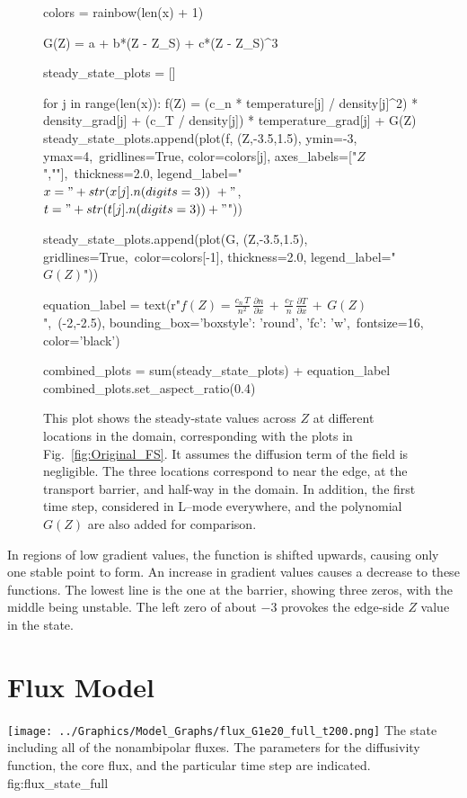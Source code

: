\begin{figure}[tb]
\begin{sagesilent}
		colors = rainbow(len(x) + 1)

		G(Z) = a + b*(Z - Z_S) + c*(Z - Z_S)^3

		steady_state_plots = []

		for j in range(len(x)):
		    f(Z) = (c_n * temperature[j] / density[j]^2) * density_grad[j] + (c_T / density[j]) * temperature_grad[j] + G(Z)
		    steady_state_plots.append(plot(f, (Z,-3.5,1.5), ymin=-3, ymax=4,\
		    		gridlines=True, color=colors[j], axes_labels=["$Z$",""],\
		    		thickness=2.0, legend_label="$x = " +str(x[j].n(digits=3))\
		    		+"$, $t = " +str(t[j].n(digits=3))+ "$"))

		steady_state_plots.append(plot(G, (Z,-3.5,1.5), gridlines=True,\
				color=colors[-1], thickness=2.0, legend_label="$G(Z)$"))

		equation_label = text(r"$f(Z) = \frac{c_n \, T}{n^2} \, \frac{\partial n}{\partial x} \,+\, \frac{c_T}{n} \, \frac{\partial T}{\partial x} \,+\, G(Z)$",\
				(-2,-2.5), bounding_box={'boxstyle': 'round', 'fc': 'w'},\
				fontsize=16, color='black')

		combined_plots = sum(steady_state_plots) + equation_label
		combined_plots.set_aspect_ratio(0.4)
	\end{sagesilent}
	\sageplot[width=0.9\textwidth]{combined_plots}
	\caption{This plot shows the steady-state values across $Z$ at different locations in the domain, corresponding with the plots in Fig.~\ref{fig:Original_FS}.
	It assumes the diffusion term of the field is negligible.
	The three locations correspond to near the edge, at the transport barrier, and half-way in the domain.
	In addition, the first time step, considered in L--mode everywhere, and the polynomial $G(Z)$ are also added for comparison.}
	\label{fig:original_stationary_vs_Z}
\end{figure}

In regions of low gradient values, the function is shifted upwards, causing only one stable point to form.
An increase in gradient values causes a decrease to these functions.
The lowest line is the one at the barrier, showing three zeros, with the middle being unstable.
The left zero of about $-3$ provokes the edge-side $Z$ value in the state.

\section{Flux Model} \label{sec:flux_results}


	{\texttt{[image: ../Graphics/Model\_Graphs/flux\_G1e20\_full\_t200.png]}}
	{The state including all of the nonambipolar fluxes.
	The parameters for the diffusivity function, the core flux, and the particular time step are indicated.
	}
	{fig:flux_state_full}

